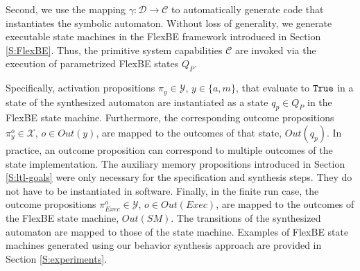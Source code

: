 Second, we use the mapping $\gamma: \mathcal{D} \rightarrow \mathcal{C}$ to automatically generate code that instantiates the symbolic automaton.
Without loss of generality, we generate executable state machines in the FlexBE framework introduced in Section \ref{S:FlexBE}.
Thus, the primitive system capabilities $\mathcal{C}$ are invoked via the execution of parametrized FlexBE states $Q_P$.

Specifically, activation propositions $\pi_y \in \mathcal{Y}$, $y \in \{ a, m \}$, that evaluate to $\mathtt{True}$ in a state of the synthesized automaton are instantiated as a state $q_p \in Q_P$ in the FlexBE state machine.
Furthermore, the corresponding outcome propositions $\pi_y^o \in \mathcal{X}$, $o \in Out(y)$, are mapped to the outcomes of that state, $Out(q_p)$.
In practice, an outcome proposition can correspond to multiple outcomes of the state implementation.
The auxiliary memory propositions introduced in Section \ref{S:ltl-goals} were only necessary for the specification and synthesis steps.
They do not have to be instantiated in software.
Finally, in the finite run case, the outcome propositions $\pi_{Exec}^o \in \mathcal{Y}$, $o \in Out(Exec)$, are mapped to the outcomes of the FlexBE state machine, $Out(SM)$.
The transitions of the synthesized automaton are mapped to those of the state machine.
Examples of FlexBE state machines generated using our behavior synthesis approach are provided in Section \ref{S:experiments}.


